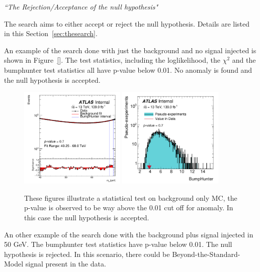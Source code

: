 \textit{``The Rejection/Acceptance of the null hypothesis"}

The search aims to either accept or reject the null hypothesis. Details are listed in this Section~\ref{sec:thesearch}.

An example of the search done with just the background and no signal injected is shown in Figure~\ref{}. The test statistics, including 
the loglikelihood, the $\chi^{2}$ and the bumphunter test statistics all have p-value below 0.01. No anomaly is found and the null hypothesis is accepted.
    
\begin{figure}[!htb]
    \begin{center}
        \includegraphics[width=0.45\textwidth]{figures/chapter_dimuon/nominal_fixed}
        \includegraphics[width=0.45\textwidth]{figures/chapter_dimuon/bumpHunterStatPlot}
        \caption{
        These figures illustrate a statistical test on background only MC, the p-value is observed to be way above the 0.01 cut off for anomaly. In  this case the null hypothesis is accepted.
        }
    \label{fig:dimuonstudies}
    \end{center}
\end{figure}
\FloatBarrier

An other example of the search done with the background plus signal injected in 50 GeV. The bumphunter test statistics have p-value below 0.01. The null hypothesis is rejected. In this scenario, there could be Beyond-the-Standard-Model signal present in the data.

